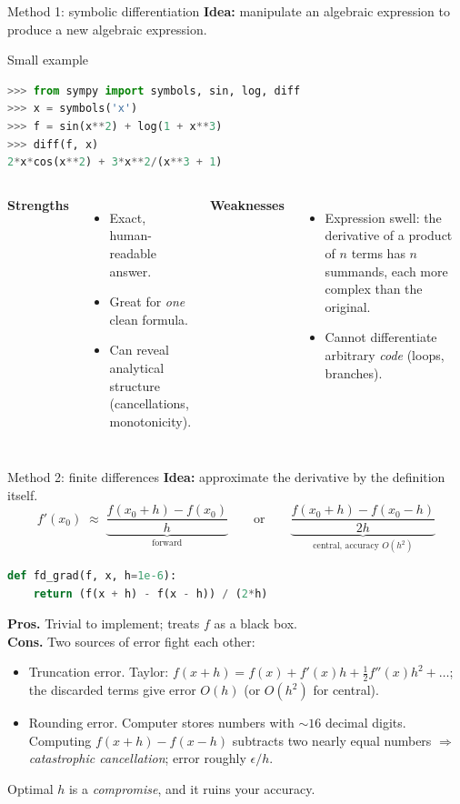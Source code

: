 \documentclass[aspectratio=169,11pt]{beamer}
\newcommand{\emphc}[1]{\textcolor{harvardcrimson}{#1}}
\begin{document}
\begin{frame}[fragile]{Method 1: symbolic differentiation}
\small \textbf{Idea:} manipulate an algebraic expression to produce a new algebraic expression.
\begin{exampleblock}{Small example}
\small
\begin{lstlisting}[language=Python,basicstyle=\ttfamily\scriptsize]
>>> from sympy import symbols, sin, log, diff
>>> x = symbols('x')
>>> f = sin(x**2) + log(1 + x**3)
>>> diff(f, x)
2*x*cos(x**2) + 3*x**2/(x**3 + 1)
\end{lstlisting}
\end{exampleblock}
\begin{columns}
\textbf{Strengths}
\begin{itemize}\itemsep2pt
\item Exact, human-readable answer.
\item Great for \emph{one} clean formula.
\item Can reveal analytical structure (cancellations, monotonicity).
\end{itemize}
\textbf{Weaknesses}
\begin{itemize}\itemsep2pt
\item \emphc{Expression swell}: the derivative of a product of $n$ terms has $n$ summands, each more complex than the original.
\item Cannot differentiate arbitrary \emph{code} (loops, branches).
\end{itemize}
\end{columns}
\end{frame}

\begin{frame}[fragile]{Method 2: finite differences}
\small \textbf{Idea:} approximate the derivative by the definition itself.
\[
f'(x_0) \;\approx\; \underbrace{\frac{f(x_0+h) - f(x_0)}{h}}_{\text{forward}}
\qquad\text{or}\qquad
\underbrace{\frac{f(x_0+h)-f(x_0-h)}{2h}}_{\text{central, accuracy }O(h^2)}
\]
\begin{lstlisting}[language=Python,basicstyle=\ttfamily\scriptsize]
def fd_grad(f, x, h=1e-6):
    return (f(x + h) - f(x - h)) / (2*h)
\end{lstlisting}

\textbf{Pros.} Trivial to implement; treats $f$ as a black box.\\[2pt]
\textbf{Cons.} Two sources of error fight each other:
\begin{itemize}\itemsep2pt
\item \emphc{Truncation error.} Taylor: $f(x+h) = f(x) + f'(x)h + \tfrac{1}{2}f''(x)h^2 + \ldots$; the discarded terms give error $O(h)$ (or $O(h^2)$ for central).
\item \emphc{Rounding error.} Computer stores numbers with $\sim 16$ decimal digits. Computing $f(x+h)-f(x-h)$ subtracts two nearly equal numbers $\Rightarrow$ \emph{catastrophic cancellation}; error roughly $\epsilon / h$.
\end{itemize}
\centerline{Optimal $h$ is a \emph{compromise}, and it ruins your accuracy.}
\end{frame}
\end{document}
